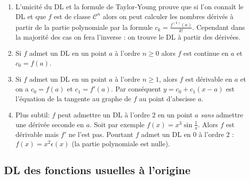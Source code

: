 \documentclass[class=report,crop=false]{standalone}
\begin{document}
\begin{remarque*}
\sauteligne
\begin{enumerate}
  \item L'unicité du DL et la formule de Taylor-Young
prouve que si l'on connaît le DL et que $f$ est de classe $\mathcal{C}^n$ alors
on peut calculer les nombres dérivés à partir de la partie polynomiale par la formule
$c_k = \frac{f^{(k)}(a)}{k!}$. Cependant dans la majorité des cas on fera l'inverse :
on trouve le DL à partir des dérivées.

  \item  Si $f$ admet un DL en un point $a$ à l'ordre $n \ge
   0$ alors $f$ est continue en $a$ et $c_0=f(a)$.

\item Si $f$ admet un DL en un point $a$ à l'ordre $n \ge1$,
alors $f$ est dérivable en $a$ et on a  $c_0=f(a)$ et $c_1=f'(a)$.
Par conséquent $y=c_0+c_1(x-a)$ est l'équation de la tangente au graphe de $f$
au point d'abscisse $a$.

\item Plus subtil: $f$ peut admettre un DL à l'ordre $2$ en
   un point $a$ \emph{sans} admettre une dérivée seconde en $a$.
Soit par exemple $f(x) = x^3 \sin\frac1x$. Alors $f$ est dérivable mais
$f'$ ne l'est pas. Pourtant $f$ admet un DL en $0$ à l'ordre $2$ :
$f(x)=x^2 \epsilon(x)$ (la partie polynomiale est nulle).
\end{enumerate}
\end{remarque*}

\subsection{DL des fonctions usuelles à l'origine}
\end{document}
